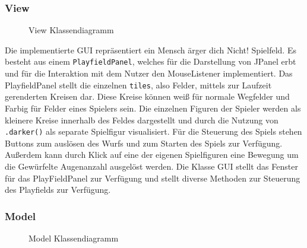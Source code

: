 \documentclass[conference]{IEEEtran}
\begin{document}
\subsubsection{View}
\begin{figure}[]
    \centering
    \caption{View Klassendiagramm}
\end{figure}

Die implementierte GUI repr\"asentiert ein Mensch \"arger dich Nicht! Spielfeld. Es besteht aus einem \texttt{PlayfieldPanel}, welches f\"ur die Darstellung von JPanel erbt und f\"ur die Interaktion mit dem Nutzer den MouseListener implementiert. Das PlayfieldPanel stellt die einzelnen \texttt{tiles}, also Felder, mittels zur Laufzeit gerenderten Kreisen dar. Diese Kreise k\"onnen wei{\ss}   f\"ur normale Wegfelder und Farbig f\"ur Felder eines Spielers sein. 
  Die einzelnen Figuren der Spieler werden als kleinere Kreise innerhalb des Feldes dargestellt und durch die Nutzung von \texttt{.darker()} als separate Spielfigur visualisiert. Für die Steuerung des Spiels stehen Buttons zum auslösen des Wurfs und zum Starten des Spiels zur Verfügung. Außerdem kann durch Klick auf eine der eigenen Spielfiguren eine Bewegung um die Gewürfelte Augenanzahl ausgelöst werden. 
  Die Klasse GUI stellt das Fenster f\"ur das PlayFieldPanel zur Verfügung und stellt diverse Methoden zur Steuerung des Playfields zur Verf\"ugung. 

\subsubsection{Model}


\begin{figure}[]
    \centering
    \caption{Model Klassendiagramm}
\end{figure}
\end{document}
